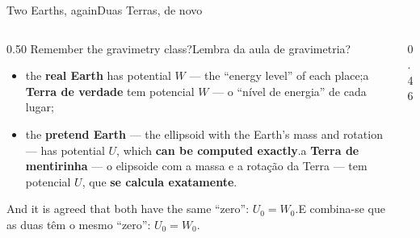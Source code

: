 \documentclass[aspectratio=169,11pt]{beamer}
\newcommand{\tr}[2]{\ifEN#2\else#1\fi}
\newcommand{\bnum}[1]{\textbf{\textcolor{mTeal}{#1}}}
\begin{document}
\begin{frame}{\tr{Duas Terras, de novo}{Two Earths, again}}
  \begin{columns}[T]
    \begin{column}{0.50\textwidth}
      \tr{Lembra da aula de gravimetria?}{Remember the gravimetry class?}
      \begin{itemize}
        \setlength{\itemsep}{4pt}
        \item \tr{a \textcolor{corMassa}{\textbf{Terra de verdade}} tem potencial $W$ --- o
              ``nível de energia'' de cada lugar;}{the \textcolor{corMassa}{\textbf{real
              Earth}} has potential $W$ --- the ``energy level'' of each place;}
        \item \tr{a \textcolor{corIdeal}{\textbf{Terra de mentirinha}} --- o elipsoide com a
              massa e a rotação da Terra --- tem potencial $U$, que \bnum{se calcula
              exatamente}.}{the \textcolor{corIdeal}{\textbf{pretend Earth}} --- the ellipsoid
              with the Earth's mass and rotation --- has potential $U$, which \bnum{can be
              computed exactly}.}
      \end{itemize}
      \tr{E combina-se que as duas têm o mesmo ``zero'': $U_0 = W_0$.}{And it is agreed that
      both have the same ``zero'': $U_0 = W_0$.}
    \end{column}
    \begin{column}{0.46\textwidth}
      \centering
    \end{column}
  \end{columns}
\end{frame}
\end{document}
